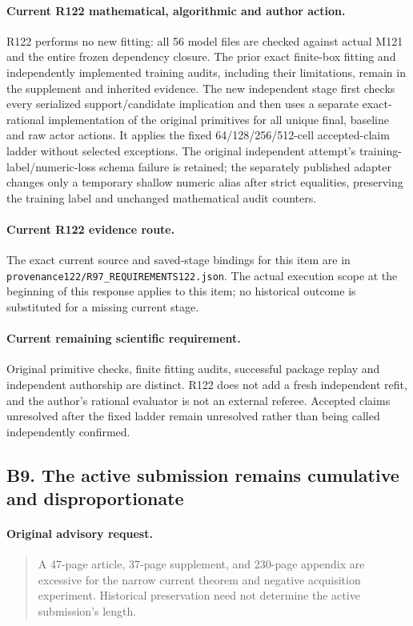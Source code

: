 \paragraph{Current R122 mathematical, algorithmic and author action.}
R122 performs no new fitting: all 56 model files are checked against actual M121 and the entire frozen dependency closure. The prior exact finite-box fitting and independently implemented training audits, including their limitations, remain in the supplement and inherited evidence. The new independent stage first checks every serialized support/candidate implication and then uses a separate exact-rational implementation of the original primitives for all unique final, baseline and raw actor actions. It applies the fixed 64/128/256/512-cell accepted-claim ladder without selected exceptions. The original independent attempt's training-label/numeric-loss schema failure is retained; the separately published adapter changes only a temporary shallow numeric alias after strict equalities, preserving the training label and unchanged mathematical audit counters.
\paragraph{Current R122 evidence route.}
The exact current source and saved-stage bindings for this item are in \nolinkurl{provenance122/R97_REQUIREMENTS122.json}. The actual execution scope at the beginning of this response applies to this item; no historical outcome is substituted for a missing current stage.
\paragraph{Current remaining scientific requirement.}
Original primitive checks, finite fitting audits, successful package replay and independent authorship are distinct. R122 does not add a fresh independent refit, and the author's rational evaluator is not an external referee. Accepted claims unresolved after the fixed ladder remain unresolved rather than being called independently confirmed.

\subsection{B9. The active submission remains cumulative and disproportionate}
\label{response122:B9}

\paragraph{Original advisory request.}
\begin{quote}
A 47-page article, 37-page supplement, and 230-page appendix are excessive for the narrow current theorem and negative acquisition experiment. Historical preservation need not determine the active submission's length.
\end{quote}

